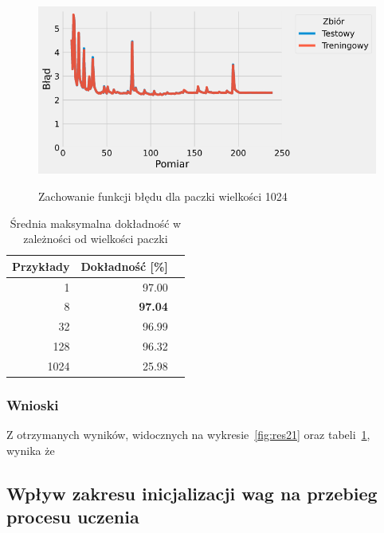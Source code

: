 \documentclass{article}
\begin{document}
\begin{figure}[H]
	\centering
	\caption{Zachowanie funkcji błędu dla paczki wielkości 1024}
	\includegraphics[width=\textwidth]{batch_err_1024.png}
	\label{fig:res27}
\end{figure}

\begin{table}[H]
	\caption{Średnia maksymalna dokładność w zależności od wielkości paczki}
	\label{tabela-res-21}
	\centering
	\begin{tabular}{rrr}
		\toprule
		Przykłady & Dokładność [\%] \\
		\midrule
		1          & 97.00              \\
		8          & \textbf{97.04}     \\
		32         & 96.99              \\
		128        & 96.32              \\
		1024       & 25.98              \\
		\bottomrule
	\end{tabular}
\end{table}

\subsubsection*{Wnioski}

Z otrzymanych wyników, widocznych na wykresie~\ref{fig:res21} oraz tabeli~\ref{tabela-res-21}, wynika że

\newpage
\subsection{Wpływ zakresu inicjalizacji wag na przebieg procesu uczenia}
\end{document}
